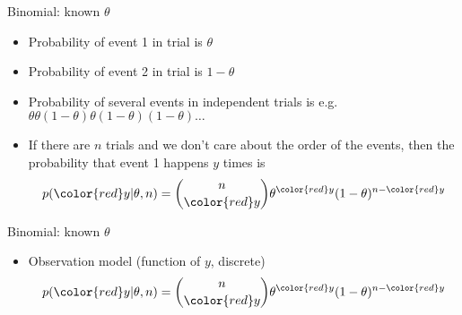 \documentclass[english,t]{beamer}
\begin{document}
\begin{frame}{Binomial: known $\theta$}

  \begin{itemize}
  \item Probability of event 1 in trial is $\theta$
  \item<2-> Probability of event 2 in trial is $1-\theta$
  \item<3-> Probability of several events in independent trials is e.g.\\
    $\theta\theta(1-\theta)\theta(1-\theta)(1-\theta)\ldots$
  \item<4-> If there are $n$ trials and we don't care about the order
    of the events, then the probability that event 1 happens {\color{red}$y$} times
    is
    \begin{align*}
      p({\color{red}y}|\theta,n) = \binom{n}{{\color{red}y}} \theta^{\color{red}y}(1-\theta)^{n-{\color{red}y}}
    \end{align*}
  \end{itemize}

\end{frame}

\begin{frame}{Binomial: known $\theta$}

  \begin{itemize}
  \item {\color{blue}Observation model} (function of {\color{red} $y$}, discrete)
    \begin{align*}
      p({\color{red}y}|\theta,n) = \binom{n}{{\color{red}y}} \theta^{\color{red}y}(1-\theta)^{n-{\color{red}y}}
    \end{align*}
  \end{itemize}

  \begin{center}
  \end{center}
\end{frame}
\end{document}
